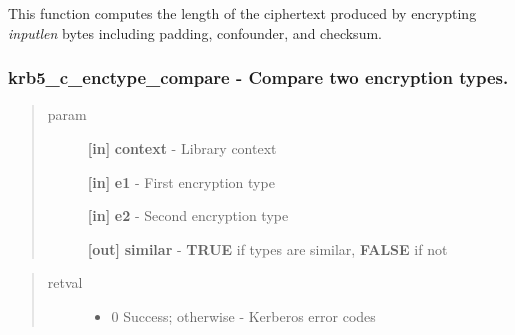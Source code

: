 \documentclass[letterpaper,10pt,english]{sphinxmanual}
\begin{document}
This function computes the length of the ciphertext produced by encrypting \emph{inputlen} bytes including padding, confounder, and checksum.


\subsubsection{krb5\_c\_enctype\_compare -  Compare two encryption types.}
\label{appdev/refs/api/krb5_c_enctype_compare::doc}\label{appdev/refs/api/krb5_c_enctype_compare:krb5-c-enctype-compare-compare-two-encryption-types}

\begin{fulllineitems}
\label{appdev/refs/api/krb5_c_enctype_compare:c.krb5_c_enctype_compare}
\end{fulllineitems}

\begin{quote}\begin{description}
\item[{param}] \leavevmode
\textbf{{[}in{]}} \textbf{context} - Library context

\textbf{{[}in{]}} \textbf{e1} - First encryption type

\textbf{{[}in{]}} \textbf{e2} - Second encryption type

\textbf{{[}out{]}} \textbf{similar} - \textbf{TRUE} if types are similar, \textbf{FALSE} if not

\end{description}\end{quote}
\begin{quote}\begin{description}
\item[{retval}] \leavevmode\begin{itemize}
\item {} 
0   Success; otherwise - Kerberos error codes

\end{itemize}

\end{description}\end{quote}
\end{document}
